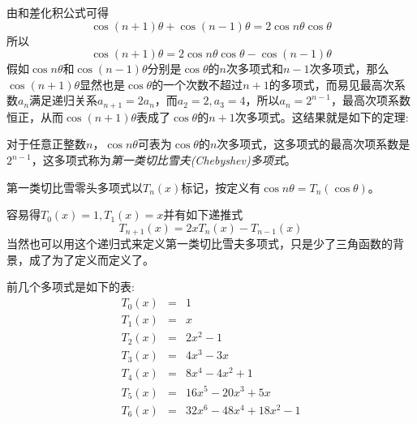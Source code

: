 由和差化积公式可得
\[ \cos{(n+1)\theta}+\cos{(n-1)\theta}=2\cos{n\theta}\cos{\theta} \]
所以
\[ \cos{(n+1)\theta}=2\cos{n\theta}\cos{\theta}-\cos{(n-1)\theta} \]
假如$\cos{n\theta}$和$\cos{(n-1)\theta}$分别是$\cos{\theta}$的$n$次多项式和$n-1$次多项式，那么$\cos{(n+1)\theta}$显然也是$\cos{\theta}$的一个次数不超过$n+1$的多项式，而易见最高次系数$a_n$满足递归关系$a_{n+1}=2a_n$，而$a_2=2,a_3=4$，所以$a_n=2^{n-1}$，最高次项系数恒正，从而$\cos{(n+1)\theta}$表成了$\cos{\theta}$的$n+1$次多项式。这结果就是如下的定理:

\begin{theorem}
  对于任意正整数$n$，$\cos{n\theta}$可表为$\cos{\theta}$的$n$次多项式，这多项式的最高次项系数是$2^{n-1}$，这多项式称为\emph{第一类切比雪夫(Chebyshev)多项式}。
\end{theorem}

第一类切比雪零头多项式以$T_n(x)$标记，按定义有$\cos{n\theta}=T_n(\cos{\theta})$。

容易得$T_0(x)=1,T_1(x)=x$并有如下递推式
\begin{equation}
  \label{eq:first-chebyshev-polynome-recursion}
  T_{n+1}(x)=2xT_n(x)-T_{n-1}(x)
\end{equation}
当然也可以用这个递归式来定义第一类切比雪夫多项式，只是少了三角函数的背景，成了为了定义而定义了。

前几个多项式是如下的表:
\begin{eqnarray*}
  T_0(x) & = & 1 \\
  T_1(x) & = & x \\
  T_2(x) & = & 2x^2-1 \\
  T_3(x) & = & 4x^3-3x \\
  T_4(x) & = & 8x^4-4x^2+1 \\
  T_5(x) & = & 16x^5-20x^3+5x \\
  T_6(x) & = & 32x^6-48x^4+18x^2-1
\end{eqnarray*}

